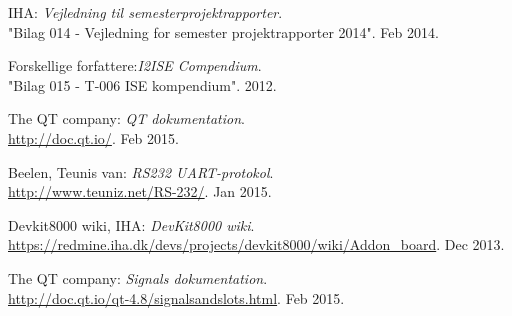 \begin{thebibliography}{2}
 IHA: \textit{Vejledning til semesterprojektrapporter}. \\
"Bilag 014 - Vejledning for semester projektrapporter 2014". Feb 2014.

 Forskellige forfattere:\textit{I2ISE Compendium}. \\
"Bilag 015 - T-006 ISE kompendium". 2012.

 The QT company: \textit{QT dokumentation}. \\
\url{http://doc.qt.io/}. Feb 2015.

 Beelen, Teunis van: \textit{RS232 UART-protokol}. \\
\url{http://www.teuniz.net/RS-232/}. Jan 2015.

 Devkit8000 wiki, IHA: \textit{DevKit8000 wiki}. \\
\url{https://redmine.iha.dk/devs/projects/devkit8000/wiki/Addon_board}. Dec 2013.

 The QT company: \textit{Signals dokumentation}. \\
\url{http://doc.qt.io/qt-4.8/signalsandslots.html}. Feb 2015.

\end{thebibliography}